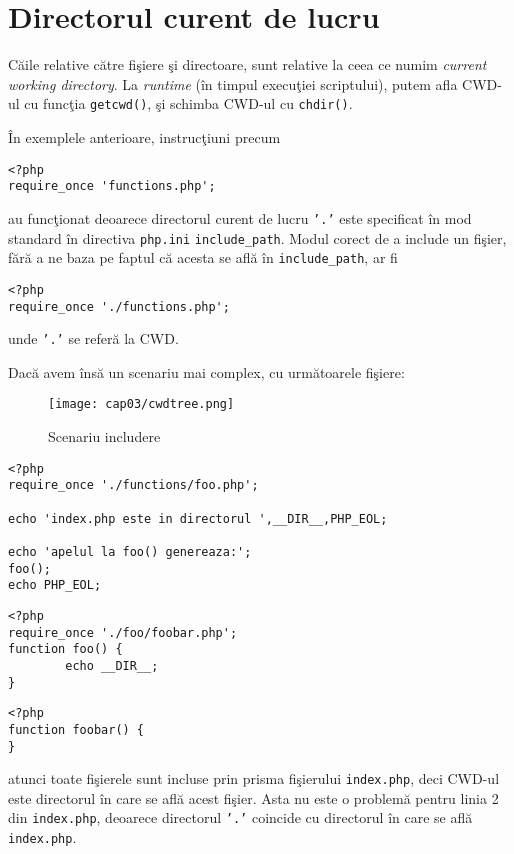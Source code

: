 \section{Directorul curent de lucru}
Căile relative către fişiere şi directoare,
sunt relative la ceea ce numim \textsl{current working
directory}. La \textsl{runtime} (în timpul execuţiei
scriptului), putem afla CWD-ul cu
funcţia \texttt{getcwd()}, şi schimba CWD-ul cu \texttt{chdir()}.

În exemplele anterioare, instrucţiuni precum
\begin{lstlisting}
<?php
require_once 'functions.php';
\end{lstlisting}
au funcţionat deoarece directorul curent de lucru \texttt{'.'}
este specificat în mod standard în directiva \texttt{php.ini}
\texttt{include\_path}. Modul corect de a include un fişier, fără
a ne baza pe faptul că acesta se află în \texttt{include\_path}, ar fi
\begin{lstlisting}
<?php
require_once './functions.php';
\end{lstlisting}
unde \texttt{'.'} se referă la CWD.

Dacă avem însă un scenariu mai complex, cu următoarele fişiere:
\begin{figure}[ht!]
  \centering
    \texttt{[image: cap03/cwdtree.png]}
  \caption{Scenariu includere}
  \label{fig:cwdtree}
\end{figure}

\begin{lstlisting}[title=index.php]
<?php
require_once './functions/foo.php';

echo 'index.php este in directorul ',__DIR__,PHP_EOL;

echo 'apelul la foo() genereaza:';
foo();
echo PHP_EOL;
\end{lstlisting}

\begin{lstlisting}[title=functions/foo.php]
<?php
require_once './foo/foobar.php';
function foo() {
        echo __DIR__;
}
\end{lstlisting}

\begin{lstlisting}[title=functions/foo/foobar.php]
<?php
function foobar() {
}
\end{lstlisting}

atunci toate fişierele sunt incluse prin prisma fişierului
\texttt{index.php}, deci CWD-ul este directorul
în care se află acest fişier. Asta nu este
o problemă pentru linia 2 din \texttt{index.php},
deoarece directorul \texttt{'.'} coincide
cu directorul în care se află \texttt{index.php}.

